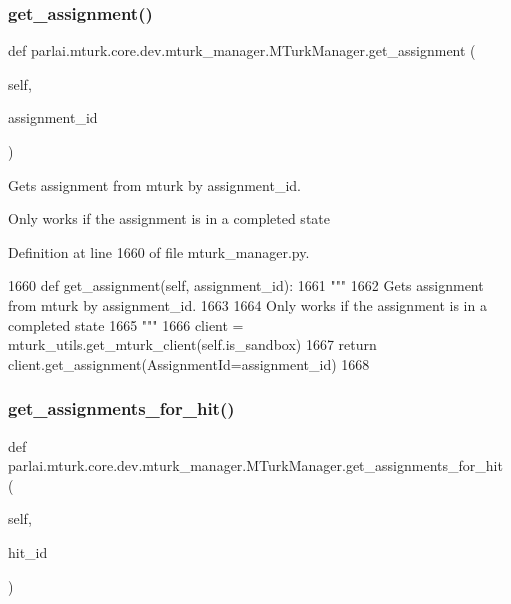 \subsubsection{\texorpdfstring{get\+\_\+assignment()}{get\_assignment()}}
{\footnotesize\ttfamily def parlai.\+mturk.\+core.\+dev.\+mturk\+\_\+manager.\+M\+Turk\+Manager.\+get\+\_\+assignment (\begin{DoxyParamCaption}\item[{}]{self,  }\item[{}]{assignment\+\_\+id }\end{DoxyParamCaption})}

\begin{DoxyVerb}Gets assignment from mturk by assignment_id.

Only works if the assignment is in a completed state
\end{DoxyVerb}
 

Definition at line 1660 of file mturk\+\_\+manager.\+py.


\begin{DoxyCode}
1660     \textcolor{keyword}{def }get\_assignment(self, assignment\_id):
1661         \textcolor{stringliteral}{"""}
1662 \textcolor{stringliteral}{        Gets assignment from mturk by assignment\_id.}
1663 \textcolor{stringliteral}{}
1664 \textcolor{stringliteral}{        Only works if the assignment is in a completed state}
1665 \textcolor{stringliteral}{        """}
1666         client = mturk\_utils.get\_mturk\_client(self.is\_sandbox)
1667         \textcolor{keywordflow}{return} client.get\_assignment(AssignmentId=assignment\_id)
1668 
\end{DoxyCode}
\mbox{\label{classparlai_1_1mturk_1_1core_1_1dev_1_1mturk__manager_1_1MTurkManager_a305def6340d70d27d773d3a44067365b}} 
\subsubsection{\texorpdfstring{get\+\_\+assignments\+\_\+for\+\_\+hit()}{get\_assignments\_for\_hit()}}
{\footnotesize\ttfamily def parlai.\+mturk.\+core.\+dev.\+mturk\+\_\+manager.\+M\+Turk\+Manager.\+get\+\_\+assignments\+\_\+for\+\_\+hit (\begin{DoxyParamCaption}\item[{}]{self,  }\item[{}]{hit\+\_\+id }\end{DoxyParamCaption})}


